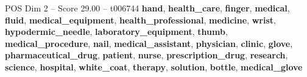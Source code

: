 \begin{textsample}{POS Dim 2 – Score 29.00 – t006744}  \label{ex:f2_pos_017}
\textbf{hand}, \textbf{health\_care}, \textbf{finger}, \textbf{medical}, \textbf{fluid}, \textbf{medical\_equipment}, \textbf{health\_professional}, \textbf{medicine}, \textbf{wrist}, \textbf{hypodermic\_needle}, \textbf{laboratory\_equipment}, \textbf{thumb}, \textbf{medical\_procedure}, \textbf{nail}, \textbf{medical\_assistant}, \textbf{physician}, \textbf{clinic}, \textbf{glove}, \textbf{pharmaceutical\_drug}, \textbf{patient}, \textbf{nurse}, \textbf{prescription\_drug}, \textbf{research}, \textbf{science}, \textbf{hospital}, \textbf{white\_coat}, \textbf{therapy}, \textbf{solution}, \textbf{bottle}, \textbf{medical\_glove}

\end{textsample}
